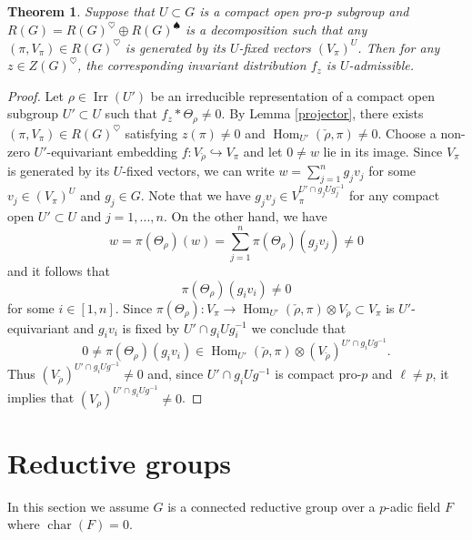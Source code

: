 \documentclass[12pt]{amsart}
\newtheorem{thm}{Theorem}[section]
\theoremstyle{definition}
\numberwithin{equation}{section}
\theoremstyle{remark}
\newcommand{\on}{\operatorname}
\newcommand{\Hom}{{\on{Hom}}}
\newcommand{\Irr}{\operatorname{Irr}}
\begin{document}
\begin{thm}\label{main}
Suppose that $U\subset G$ is a compact open pro-$p$ subgroup and $R(G)=R(G)^{\heartsuit}\oplus R(G)^{\spadesuit}$ is a
 decomposition
such that any $(\pi,V_\pi)\in R(G)^\heartsuit$ is generated by its $U$-fixed vectors $(V_\pi)^U$. Then for any $z\in Z(G)^\heartsuit$,  the corresponding 
invariant distribution $f_z$ is $U$-admissible.
 
\end{thm}
\begin{proof}
Let $\rho\in\Irr(U')$ be an irreducible representation of a compact open subgroup $U'\subset U$
such that  $f_z*\Theta_\rho\neq0$.
By Lemma \ref{projector}, there exists 
 $(\pi,V_\pi)\in R(G)^\heartsuit$ 
 satisfying $z(\pi)\neq0$ and 
 $\Hom_{U'}(\check\rho,\pi)\neq 0$.
Choose a non-zero $U'$-equivariant embedding 
$f:V_{\check\rho}\hookrightarrow V_\pi$ and let 
$0\neq w$ lie in its image. 
Since $V_\pi$ is generated by its $U$-fixed vectors, we can 
write
$w=\sum_{j=1}^n g_jv_j$ for some
$v_j\in (V_\pi)^{U}$ and $g_j\in G$. Note that we have 
$g_jv_j\in V_{\pi}^{U'\cap g_jUg_j^{-1}}$ for 
any compact open $U'\subset U$ and 
$j=1,...,n$. On the other hand, we have
\[w=\pi(\Theta_\rho)(w)=\sum_{j=1}^n\pi(\Theta_\rho)(g_jv_j)\neq 0\]
and it follows that 
\[\pi(\Theta_\rho)(g_iv_i)\neq 0\]
for some $i\in [1,n]$.
Since  $\pi(\Theta_\rho):V_\pi\to \Hom_{U'}(\check\rho,\pi)\otimes V_{\check\rho}\subset V_\pi$
is $U'$-equivariant and 
$g_iv_i$ is fixed by $U'\cap g_iUg_i^{-1}$ we conclude that 
\[0\neq\pi(\Theta_\rho)(g_iv_i)\in\Hom_{U'}(\check\rho,\pi)\otimes (V_{\check\rho})^{U'\cap g_i Ug^{-1}}.\]
Thus $(V_{\check\rho})^{U'\cap g_i Ug^{-1}}\neq0$
and, since $U'\cap g_i Ug^{-1}$ is compact
 pro-$p$ and $\ell\neq p$, it implies that 
$(V_\rho)^{U'\cap g_i Ug^{-1}}\neq0$.
\end{proof}









\section{Reductive groups}\label{reductive}
In this section we assume $G$ is a connected reductive 
group over a $p$-adic field $F$ where $\operatorname{char}(F)=0$.
\end{document}
